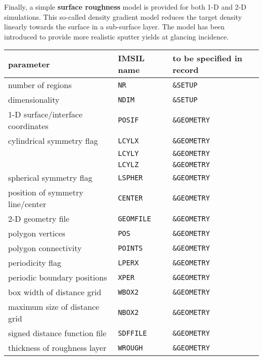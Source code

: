 Finally, a simple \textbf{surface roughness} model is provided for both 1-D and
2-D simulations. This so-called density gradient model
\cite{lindsey_simple_2017} reduces the target density linearly towards the
surface in a sub-surface layer. The model has been introduced to provide more
realistic sputter yields at glancing incidence. 


\begin{center}
\begin{tabular}{lll}
parameter \quad                   & IMSIL name    & to be specified in record \\
\hline
number of regions                 & \texttt{NR}      & \texttt{\&SETUP} \\
dimensionality                    & \texttt{NDIM}    & \texttt{\&SETUP} \\
1-D surface/interface coordinates & \texttt{POSIF}   & \texttt{\&GEOMETRY} \\
cylindrical symmetry flag         & \texttt{LCYLX}   & \texttt{\&GEOMETRY} \\
                                  & \texttt{LCYLY}   & \texttt{\&GEOMETRY} \\
                                  & \texttt{LCYLZ}   & \texttt{\&GEOMETRY} \\
spherical symmetry flag           & \texttt{LSPHER}  & \texttt{\&GEOMETRY} \\
position of symmetry line/center  & \texttt{CENTER}  & \texttt{\&GEOMETRY} \\
2-D geometry file                 & \texttt{GEOMFILE} & \texttt{\&GEOMETRY} \\
polygon vertices                  & \texttt{POS}     & \texttt{\&GEOMETRY} \\
polygon connectivity              & \texttt{POINTS}  & \texttt{\&GEOMETRY} \\
periodicity flag                  & \texttt{LPERX}   & \texttt{\&GEOMETRY} \\
periodic boundary positions       & \texttt{XPER}    & \texttt{\&GEOMETRY} \\
box width of distance grid        & \texttt{WBOX2}   & \texttt{\&GEOMETRY} \\
maximum size of distance grid     & \texttt{NBOX2}   & \texttt{\&GEOMETRY} \\
signed distance function file     & \texttt{SDFFILE} & \texttt{\&GEOMETRY} \\
thickness of roughness layer      & \texttt{WROUGH}  & \texttt{\&GEOMETRY} \\

\end{tabular}
\end{center}

